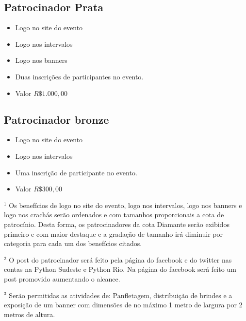 \documentclass[12pt]{article}
\begin{document}
\subsection{Patrocinador Prata}
    \begin{itemize}[label={}]
    \setlength\itemsep{0.0em}
        \item Logo no site do evento
        \item Logo nos intervalos
        \item Logo nos banners
        \item Duas inscrições de participantes no evento.
        \item Valor $R\$ 1.000,00$
    \end{itemize}
\subsection{Patrocinador bronze}
    \begin{itemize}[label={}]
    \setlength\itemsep{0.0em}
        \item Logo no site do evento
        \item Logo nos intervalos 
        \item Uma inscrição de participante no evento.
        \item Valor $R\$ 300,00$
    \end{itemize}

$^1$ Os benefícios de logo no site do evento, logo nos intervalos, logo nos banners e logo nos crachás serão ordenados e com tamanhos proporcionais a cota de patrocínio. Desta forma, os patrocinadores da cota Diamante serão exibidos primeiro e com maior destaque e a gradação de tamanho irá diminuir por categoria para cada um dos benefícios citados.

$^2$ O post do patrocinador será feito pela página do facebook e do twitter nas contas na Python Sudeste e Python Rio. Na página do facebook será feito um post promovido aumentando o alcance.

$^3$ Serão permitidas as atividades de: Panfletagem, distribuição de brindes e a exposição de um  banner com dimensões de no máximo 1 metro de largura por 2 metros de  altura.
\end{document}
